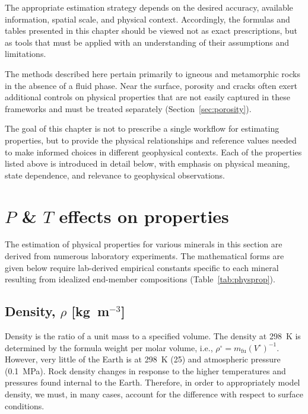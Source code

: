 The appropriate estimation strategy depends on the desired accuracy, available information, spatial scale, and physical context. Accordingly, the formulas and tables presented in this chapter should be viewed not as exact prescriptions, but as tools that must be applied with an understanding of their assumptions and limitations.

The methods described here pertain primarily to igneous and metamorphic rocks in the absence of a fluid phase. Near the surface, porosity and cracks often exert additional controls on physical properties that are not easily captured in these frameworks and must be treated separately (Section~\ref{sec:porosity}).

The goal of this chapter is not to prescribe a single workflow for estimating properties, but to provide the physical relationships and reference values needed to make informed choices in different geophysical contexts.  Each of the properties listed above is introduced in detail below, with emphasis on physical meaning, state dependence, and relevance to geophysical observations.


\section{$P$ \& $T$ effects on properties} \label{sec:prop_eq}
The estimation of physical properties for various minerals in this section are derived from numerous laboratory experiments.  The mathematical forms are given below require lab-derived empirical constants specific to each mineral resulting from idealized end-member compositions (Table~\ref{tab:physprop}).


\label{box:stp}

\subsection{Density, $\rho$ [kg~m$^{-3}$]} \label{sec:density}
Density is the ratio of a unit mass to a specified volume.  The density at
298~K is determined by the formula weight per molar volume, i.e.,
$\rho^\circ = m_\mathrm{fu} (V^\circ)^{-1}$.  However, very little of the Earth
is at 298~K (25\degC) and atmospheric pressure (0.1~MPa). Rock density
changes in response to the higher temperatures and pressures found internal
to the Earth.  Therefore, in order to appropriately model density, we must,
in many cases, account for the difference with respect to surface
conditions.

